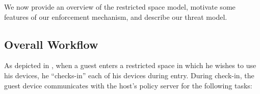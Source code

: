 \label{section:usagemodel}

We now provide an overview of the restricted space model, motivate some
features of our enforcement mechanism, and describe our threat model.

\subsection{Overall Workflow}

As depicted in , when a guest enters a
restricted space in which he wishes to use his devices, he ``checks-in'' each
of his devices during entry. During check-in, the guest device communicates
with the host's policy server for the following tasks:

